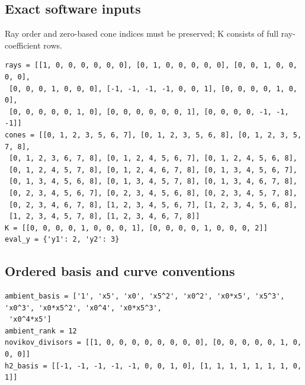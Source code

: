 \documentclass[10pt,a4paper]{article}
\begin{document}
\subsection*{Exact software inputs}
Ray order and zero-based cone indices must be preserved; K consists of full ray-coefficient rows.
\begin{lstlisting}
rays = [[1, 0, 0, 0, 0, 0, 0], [0, 1, 0, 0, 0, 0, 0], [0, 0, 1, 0, 0, 0, 0],
 [0, 0, 0, 1, 0, 0, 0], [-1, -1, -1, -1, 0, 0, 1], [0, 0, 0, 0, 1, 0, 0],
 [0, 0, 0, 0, 0, 1, 0], [0, 0, 0, 0, 0, 0, 1], [0, 0, 0, 0, -1, -1, -1]]
cones = [[0, 1, 2, 3, 5, 6, 7], [0, 1, 2, 3, 5, 6, 8], [0, 1, 2, 3, 5, 7, 8],
 [0, 1, 2, 3, 6, 7, 8], [0, 1, 2, 4, 5, 6, 7], [0, 1, 2, 4, 5, 6, 8],
 [0, 1, 2, 4, 5, 7, 8], [0, 1, 2, 4, 6, 7, 8], [0, 1, 3, 4, 5, 6, 7],
 [0, 1, 3, 4, 5, 6, 8], [0, 1, 3, 4, 5, 7, 8], [0, 1, 3, 4, 6, 7, 8],
 [0, 2, 3, 4, 5, 6, 7], [0, 2, 3, 4, 5, 6, 8], [0, 2, 3, 4, 5, 7, 8],
 [0, 2, 3, 4, 6, 7, 8], [1, 2, 3, 4, 5, 6, 7], [1, 2, 3, 4, 5, 6, 8],
 [1, 2, 3, 4, 5, 7, 8], [1, 2, 3, 4, 6, 7, 8]]
K = [[0, 0, 0, 0, 1, 0, 0, 0, 1], [0, 0, 0, 0, 1, 0, 0, 0, 2]]
eval_y = {'y1': 2, 'y2': 3}
\end{lstlisting}
\subsection*{Ordered basis and curve conventions}
\begin{lstlisting}
ambient_basis = ['1', 'x5', 'x0', 'x5^2', 'x0^2', 'x0*x5', 'x5^3', 'x0^3', 'x0*x5^2', 'x0^4', 'x0*x5^3',
 'x0^4*x5']
ambient_rank = 12
novikov_divisors = [[1, 0, 0, 0, 0, 0, 0, 0, 0], [0, 0, 0, 0, 0, 1, 0, 0, 0]]
h2_basis = [[-1, -1, -1, -1, -1, 0, 0, 1, 0], [1, 1, 1, 1, 1, 1, 1, 0, 1]]
\end{lstlisting}
\end{document}
